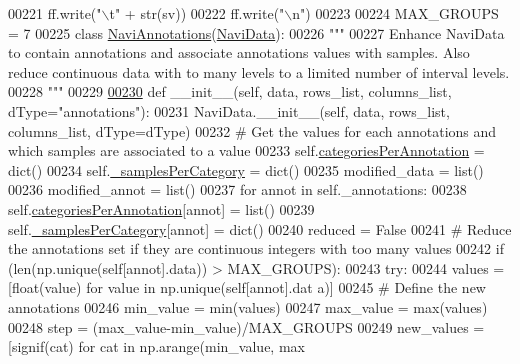 \begin{DoxyCode}
00221                     ff.write(\textcolor{stringliteral}{"\(\backslash\)t"} + str(sv))
00222                 ff.write(\textcolor{stringliteral}{"\(\backslash\)n"})
00223             
00224 MAX\_GROUPS = 7
00225 \textcolor{keyword}{class }\hyperlink{classnavicom_1_1navidata_1_1NaviAnnotations}{NaviAnnotations}(\hyperlink{classnavicom_1_1navidata_1_1NaviData}{NaviData}):
00226     \textcolor{stringliteral}{"""}
00227 \textcolor{stringliteral}{    Enhance NaviData to contain annotations and associate annotations values with
       samples. Also reduce continuous data with to many levels to a limited number of 
      interval levels.}
00228 \textcolor{stringliteral}{    """}
00229 
\hypertarget{navidata_8py_source_l00230}{}\hyperlink{classnavicom_1_1navidata_1_1NaviAnnotations}{00230}     \textcolor{keyword}{def }\_\_init\_\_(self, data, rows\_list, columns\_list, dType="annotations"):
00231         NaviData.\_\_init\_\_(self, data, rows\_list, columns\_list, dType=dType)
00232         \textcolor{comment}{# Get the values for each annotations and which samples are associated to
       a value}
00233         self.\hyperlink{classnavicom_1_1navidata_1_1NaviAnnotations_a1c26e115cb2eabe4384cd2fa0c7f776f}{categoriesPerAnnotation} = dict()
00234         self.\hyperlink{classnavicom_1_1navidata_1_1NaviAnnotations_a44c09a52d1cf049204ae3149fa5a2b34}{_samplesPerCategory} = dict()
00235         modified\_data = list()
00236         modified\_annot = list()
00237         \textcolor{keywordflow}{for} annot \textcolor{keywordflow}{in} self.\_annotations:
00238             self.\hyperlink{classnavicom_1_1navidata_1_1NaviAnnotations_a1c26e115cb2eabe4384cd2fa0c7f776f}{categoriesPerAnnotation}[annot] = list()
00239             self.\hyperlink{classnavicom_1_1navidata_1_1NaviAnnotations_a44c09a52d1cf049204ae3149fa5a2b34}{_samplesPerCategory}[annot] = dict()
00240             reduced = \textcolor{keyword}{False}
00241             \textcolor{comment}{# Reduce the annotations set if they are continuous integers with too
       many values}
00242             \textcolor{keywordflow}{if} (len(np.unique(self[annot].data)) > MAX\_GROUPS):
00243                 \textcolor{keywordflow}{try}:
00244                     values = [float(value) \textcolor{keywordflow}{for} value \textcolor{keywordflow}{in} np.unique(self[annot].dat
      a)]
00245                     \textcolor{comment}{# Define the new annotations}
00246                     min\_value = min(values)
00247                     max\_value = max(values)
00248                     step = (max\_value-min\_value)/MAX\_GROUPS
00249                     new\_values = [signif(cat) \textcolor{keywordflow}{for} cat \textcolor{keywordflow}{in} np.arange(min\_value, max

\end{DoxyCode}
